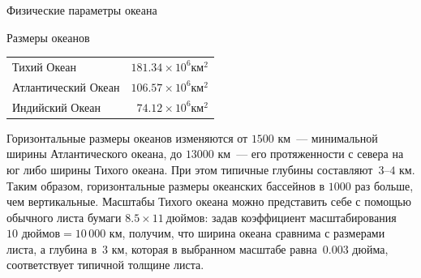 \begin{chapter}{Физические параметры океана}
\begin{section}{Размеры океанов}
\begin{tabular}{lr}
Тихий Океан         & $181.34 \times 10^6 \mbox{км}^2$ \\
Атлантический Океан & $106.57 \times 10^6 \mbox{км}^2$ \\
Индийский Океан     & $ 74.12 \times 10^6 \mbox{км}^2$ \\
\end{tabular}
%


Горизонтальные размеры океанов изменяются от $1500\mbox{~км}$~--- минимальной
ширины Атлантического океана, до $13000\mbox{~км}$~--- его протяженности
с севера на юг либо ширины Тихого океана.
При этом типичные глубины составляют~$3$--$4\mbox{~км}$.
Таким образом, горизонтальные размеры океанских бассейнов в $1000\mbox{~раз}$
больше, чем вертикальные.  Масштабы Тихого океана можно представить
себе с помощью обычного листа бумаги $8.5 \times 11~\mbox{дюймов}$:
задав коэффициент масштабирования~$10\mbox{~дюймов} = 10\,000\mbox{~км}$,
получим, что ширина океана сравнима с размерами листа, а глубина 
в~$3\mbox{~км}$, которая в выбранном масштабе равна~$0.003\mbox{~дюйма}$,
соответствует типичной толщине листа.
%



\end{section}
\end{chapter}
